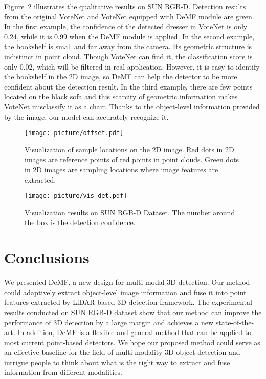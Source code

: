 \documentclass[runningheads]{llncs}
\begin{document}
Figure~\ref{fig:vis_det} illustrates the qualitative results on SUN RGB-D. Detection results from the original VoteNet and VoteNet equipped with DeMF module are given. In the first example, the confidence of the detected dresser in VoteNet is only 0.24, while it is 0.99 when the DeMF module is applied. In the second example, the bookshelf is small and far away from the camera. Its geometric structure is indistinct in point cloud. Though VoteNet can find it, the classification score is only 0.02, which will be filtered in real application. However, it is easy to identify the bookshelf in the 2D image, so DeMF can help the detector to be more confident about the detection result. In the third example, there are few points located on the black sofa and this scarcity of geometric information makes VoteNet misclassify it as a chair. Thanks to the object-level information provided by the image, our model can accurately recognize it.

\begin{figure}[t]
\centering
\texttt{[image: picture/offset.pdf]}
\caption{Visualization of sample locations on the 2D image. Red dots in 2D images are reference points of red points in point clouds. Green dots in 2D images are sampling locations where image features are extracted.}
\label{fig:refpoints}
\end{figure}

\begin{figure}[t]
\centering
\texttt{[image: picture/vis\_det.pdf]}
\caption{Visualization results on SUN RGB-D Dataset. The number around the box is the detection confidence.}
\label{fig:vis_det}
\end{figure}

\section{Conclusions}

We presented DeMF, a new design for multi-modal 3D detection. 
Our method could adaptively extract object-level image information and fuse it into point features extracted by LiDAR-based 3D detection framework. 
The experimental results conducted on SUN RGB-D dataset show that our method can improve the performance of 3D detection by a large margin and achieves a new state-of-the-art.
In addition, DeMF is a flexible and general method that can be applied to most current point-based detectors.
We hope our proposed method could serve as an effective baseline for the field of multi-modality 3D object detection and intrigue people to think about what is the right way to extract and fuse information from different modalities.
\end{document}
